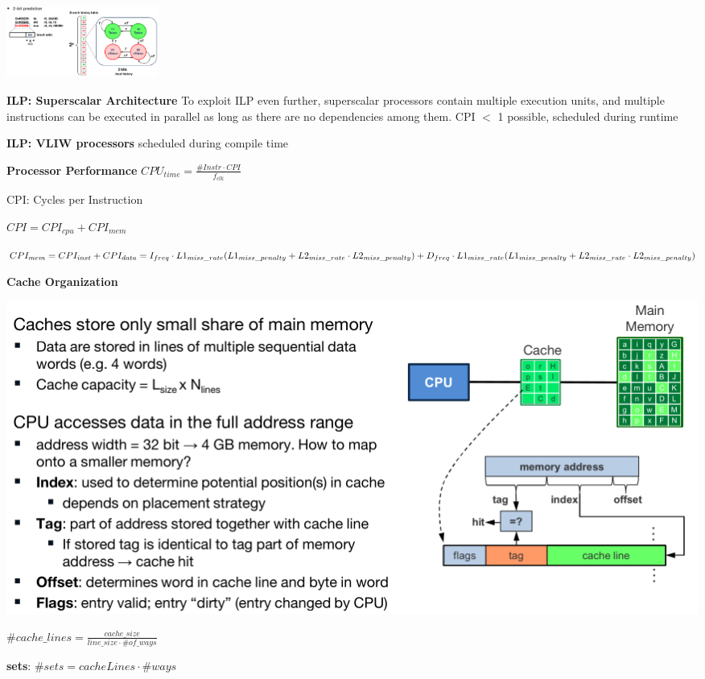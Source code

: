 \documentclass[english]{latex4ei/latex4ei_sheet}
\begin{document}
\begin{center}
	\includegraphics[width = 5cm]{images/4.ProcessorArchitecture/2BitPred.png}
\end{center}



\textbf{ILP: Superscalar Architecture} To exploit ILP even further, superscalar processors contain multiple execution units, and multiple instructions can be executed in parallel as long as there are no dependencies among them. CPI $<$ 1 possible, scheduled during runtime

\textbf{ILP: VLIW processors} scheduled during compile time

\textbf{Processor Performance} $CPU_{time} = \frac{\#Instr \cdot CPI}{f_{clk}}$

CPI: Cycles per Instruction

$CPI = CPI_{cpu} + CPI_{mem}$

$CPI_{mem} = CPI_{inst} + CPI_{data}
	\newline = I_{freq} \cdot L1_{miss\_rate} (L1_{miss\_penalty} + L2_{miss\_rate} \cdot L2_{miss\_penalty}) + D_{freq} \cdot L1_{miss\_rate} (L1_{miss\_penalty} + L2_{miss\_rate} \cdot L2_{miss\_penalty})$

\textbf{Cache Organization}

\begin{center}
	\includegraphics[width = \linewidth]{images/4.ProcessorArchitecture/cache.png}
\end{center}

$\#cache\_lines = \frac{cache\_size}{line\_size \cdot \#of\_ways}$

\textbf{sets}: $\#sets = cacheLines \cdot \#ways$
\end{document}
